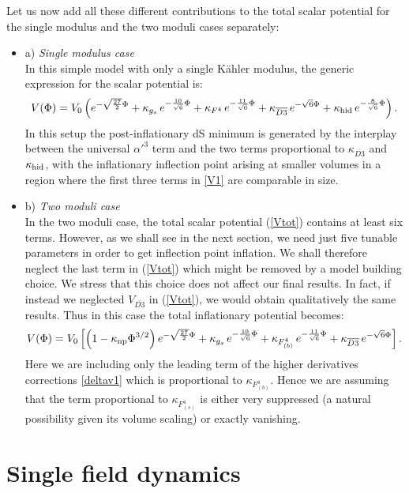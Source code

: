 \documentclass[11pt,a4paper]{article}
\newcommand{\bi}{\begin{itemize}}
\newcommand{\ei}{\end{itemize}}
\newcommand{\be}{\begin{equation}}
\newcommand{\ee}{\end{equation}}
\begin{document}
Let us now add all these different contributions to the total scalar potential for the single modulus and the two moduli cases separately: 
\bi
\item[a)] \textit{Single modulus case}\\
In this simple model with only a single K\"ahler modulus, the generic expression for the scalar potential is:
\be
V(\Phi) = V_0 \left(e^{-\sqrt{\frac{27}{2}} \Phi} + \kappa_{g_s} \,e^{- \frac{10}{\sqrt{6}} \Phi} + \kappa_{F^4} \,e^{- \frac{11}{\sqrt{6}} \Phi} 
+ \kappa_{\overline{D3}} \,e^{- {\sqrt{6}} \Phi} + \kappa_{\rm hid} \,e^{- \frac{8}{\sqrt{6}} \Phi}\right).
\label{V1}
\ee
In this setup the post-inflationary dS minimum is generated by the interplay between the universal $\alpha'^3$ term and the two terms proportional to $\kappa_{\overline{D3}}$ and $\kappa_{\rm hid}$, with the inflationary inflection point arising at smaller volumes in a region where the first three terms in \eqref{V1} are comparable in size. 

\item[b)] \textit{Two moduli case}\\
In the two moduli case, the total scalar potential (\ref{Vtot}) contains at least six terms. However, as we shall see in the next section, we need just five tunable parameters in order to get inflection point inflation. We shall therefore neglect the last term in (\ref{Vtot}) which might be removed by a model building choice. We stress that this choice does not affect our final results. In fact, if instead we neglected $V_{\overline{D3}}$ in (\ref{Vtot}), we would obtain qualitatively the same results. Thus in this case the total inflationary potential becomes:
\be
V(\Phi) = V_0 \left[\left(1 - \kappa_{\rm np} \Phi^{3/2}\right) e^{-\sqrt{\frac{27}{2}} \Phi} + \kappa_{g_s} \,e^{-\frac{10}{\sqrt{6}} \Phi} 
+ \kappa_{F^4_{(b)}} \,e^{-\frac{11}{\sqrt{6}} \Phi} + \kappa_{\overline{D3}}\, e^{- \sqrt{6} \Phi}\right].
\label{V2}
\ee
Here we are including only the leading term of the higher derivatives corrections \eqref{deltav1} which is proportional to $\kappa_{F^4_{(b)}}$. Hence we are assuming that the term proportional to $\kappa_{F^4_{(s)}}$ is either very suppressed (a natural possibility given its volume scaling) or exactly vanishing.
\ei

\section{Single field dynamics}
\label{SecSingle}
\end{document}
